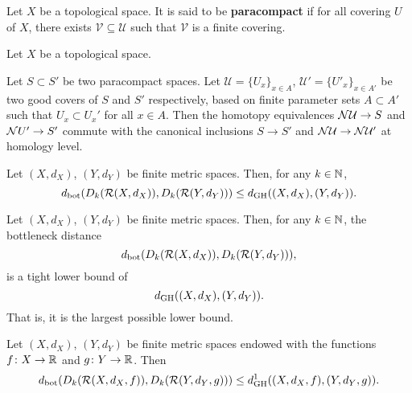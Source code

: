\begin{definition}
    Let $ X $ be a topological space. It is said to be {\bf paracompact} if for all covering $ U $ of $ X $, there exists $ \mathcal V \subseteq \mathcal U $ such that $ \mathcal V $ is a finite covering.
\end{definition}

\begin{definition}
    Let $ X $ be a topological space.
\end{definition}

\begin{lemma}
    Let $ S \subset S' $ be two paracompact spaces. Let $ \mathcal U = \{U_x\}_{x \in A}$, $ \mathcal U' = \{U'_x\}_{x \in A'}$ be two good covers of $ S $ and $ S'$ respectively, based on finite parameter sets $ A \subset A ' $ such that $ U_x \subset U_x' $ for all $ x \in A $. Then the homotopy equivalences $ \mathcal{N} \mathcal U \to S $ and $\mathcal{N} U' \to S' $ commute with the canonical inclusions $ S \to S' $ and $ \mathcal{N} \mathcal U \to \mathcal{N} \mathcal U' $ at homology level.
\end{lemma}

\begin{theorem}
    Let $ (X, d_X) $, $ (Y, d_Y) $ be finite metric spaces. Then, for any $ k \in \mathbb N$, 
    $$
        d_{\operatorname{bot}}(D_k(\mathcal{R}(X, d_X)), D_k(\mathcal{R}(Y, d_Y))) \leq d_{\operatorname{GH}}((X, d_X), (Y, d_Y)).
    $$
\end{theorem}

\begin{proposition}
    Let $ (X, d_X) $, $ (Y, d_Y) $ be finite metric spaces. Then, for any $ k \in \mathbb N$, the bottleneck distance
    $$
        d_{\operatorname{bot}}(D_k(\mathcal{R}(X, d_X)), D_k(\mathcal{R}(Y, d_Y))),
    $$
    is a tight lower bound of
    $$
        d_{\operatorname{GH}}((X, d_X), (Y, d_Y)).
    $$
    That is, it is the largest possible lower bound.
\end{proposition}

\begin{theorem}
    Let $ (X, d_X) $, $ (Y, d_Y) $ be finite metric spaces endowed with the functions $ f \colon X \to \mathbb R $ and $ g \colon Y \to \mathbb R $. Then
    $$
        d_{\operatorname{bot}}(D_k(\mathcal{R}(X, d_X, f)), D_k(\mathcal{R}(Y, d_Y, g))) \leq d_{\operatorname{GH}}^1((X, d_X, f), (Y, d_Y, g)).
    $$
\end{theorem}